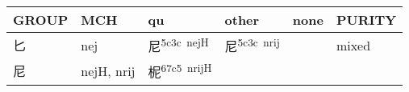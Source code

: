 \documentclass[14pt,a4paper]{scrartcl}
\begin{document}
\begin{longtable}[c]{@{}llllll@{}}
\toprule
\begin{minipage}[b]{0.14\columnwidth}\raggedright\strut
GROUP
\strut\end{minipage} &
\begin{minipage}[b]{0.14\columnwidth}\raggedright\strut
MCH
\strut\end{minipage} &
\begin{minipage}[b]{0.14\columnwidth}\raggedright\strut
qu
\strut\end{minipage} &
\begin{minipage}[b]{0.14\columnwidth}\raggedright\strut
other
\strut\end{minipage} &
\begin{minipage}[b]{0.14\columnwidth}\raggedright\strut
none
\strut\end{minipage} &
\begin{minipage}[b]{0.14\columnwidth}\raggedright\strut
PURITY
\strut\end{minipage}\tabularnewline
\midrule
\endhead
\begin{minipage}[t]{0.14\columnwidth}\raggedright\strut
匕
\strut\end{minipage} &
\begin{minipage}[t]{0.14\columnwidth}\raggedright\strut
nej
\strut\end{minipage} &
\begin{minipage}[t]{0.14\columnwidth}\raggedright\strut
尼\textsuperscript{5c3c~nejH}
\strut\end{minipage} &
\begin{minipage}[t]{0.14\columnwidth}\raggedright\strut
尼\textsuperscript{5c3c~nrij}
\strut\end{minipage} &
\begin{minipage}[t]{0.14\columnwidth}\raggedright\strut
\strut\end{minipage} &
\begin{minipage}[t]{0.14\columnwidth}\raggedright\strut
mixed
\strut\end{minipage}\tabularnewline
\begin{minipage}[t]{0.14\columnwidth}\raggedright\strut
尼
\strut\end{minipage} &
\begin{minipage}[t]{0.14\columnwidth}\raggedright\strut
nejH, nrij
\strut\end{minipage} &
\begin{minipage}[t]{0.14\columnwidth}\raggedright\strut
柅\textsuperscript{67c5~nrijH}
\strut\end{minipage} &

\end{longtable}
\end{document}
